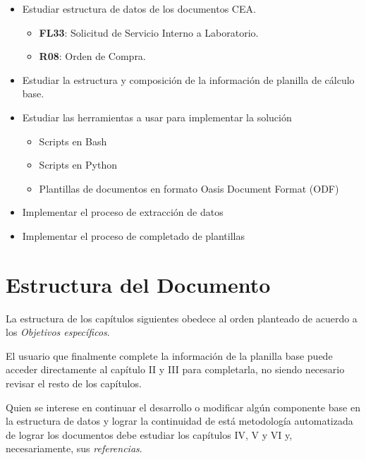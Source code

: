 \begin{itemize}
	\item{Estudiar estructura de datos de los documentos CEA.}
	\begin{itemize}
		\item \textbf{FL33}: Solicitud de Servicio Interno a Laboratorio.
		\item \textbf{R08}: Orden de Compra.
	\end{itemize}
	\item{Estudiar la estructura y composición de la información de planilla de cálculo base.}
	\item{Estudiar las herramientas a usar para implementar la solución}
	\begin{itemize}
		\item Scripts en Bash
		\item Scripts en Python
		\item Plantillas de documentos en formato Oasis Document Format (ODF)
	\end{itemize}
	\item{Implementar el proceso de extracción de datos}
	\item{Implementar el proceso de completado de plantillas}
\end{itemize}

\section*{Estructura del Documento}

La estructura de los capítulos siguientes obedece al orden planteado de acuerdo a los \textit{Objetivos específicos}.

El usuario que finalmente complete la información de la planilla base puede acceder directamente al capítulo II y III para completarla, no siendo necesario revisar el resto de los capítulos.

Quien se interese en continuar el desarrollo o modificar algún componente base en la estructura de datos y lograr la continuidad de está metodología automatizada de lograr los documentos debe estudiar los capítulos IV, V y VI y, necesariamente, sus \textit{referencias}. 
